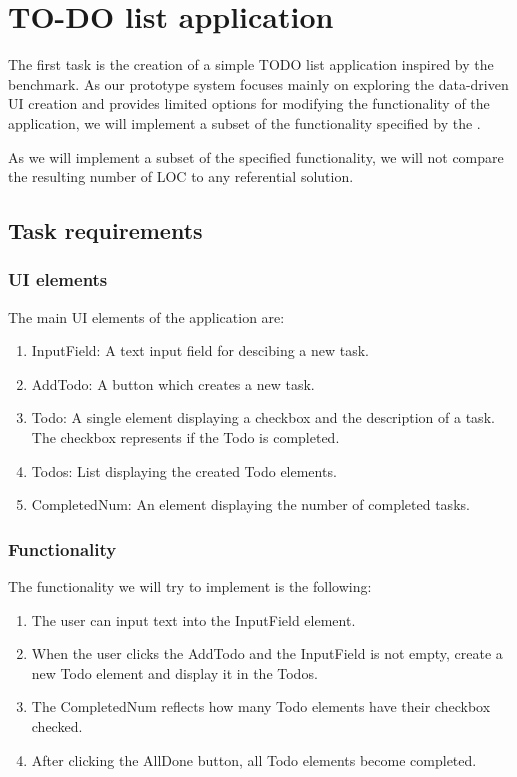 \section{TO-DO list application}
The first task is the creation of a simple TODO list application inspired by the \citet{TodoMVC} benchmark.
As our prototype system focuses mainly on exploring the data-driven UI creation and provides limited options for modifying the functionality of the application,
we will implement a subset of the functionality specified by the \citet{todo-spec}.

As we will implement a subset of the specified functionality, we will not compare the resulting number of LOC to any referential solution.

\subsection{Task requirements}
\subsubsection{UI elements}
The main UI elements of the application are:
\begin{enumerate}
	\item InputField: A text input field for descibing a new task.
	\item AddTodo: A button which creates a new task.
	\item Todo: A single element displaying a checkbox and the description of a task. The checkbox represents if the Todo is completed.
	\item Todos: List displaying the created Todo elements.
	\item CompletedNum: An element displaying the number of completed tasks.
\end{enumerate}

\subsubsection{Functionality}
The functionality we will try to implement is the following:
\begin{enumerate}
	\item The user can input text into the InputField element.
	\item When the user clicks the AddTodo and the InputField is not empty, create a new Todo element and display it in the Todos.
	\item The CompletedNum reflects how many Todo elements have their checkbox checked.
	\item After clicking the AllDone button, all Todo elements become completed.
\end{enumerate}

